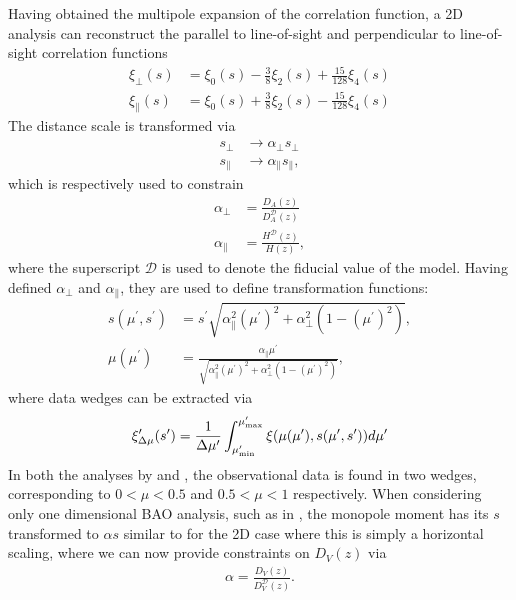 \documentclass[titlesmallcaps, examinerscopy, copyrightpage]{uqthesis}
\begin{document}
Having obtained the multipole expansion of the correlation function, a 2D analysis can reconstruct the parallel to line-of-sight and perpendicular to line-of-sight correlation functions \citep{KazinSanchezBlanton2012, SanchezKazinBeutler2013}
\begin{align}
\xi_\perp(s) &= \xi_0(s) - \frac{3}{8} \xi_2(s) + \frac{15}{128} \xi_4(s) \\
\xi_\parallel(s) &= \xi_0(s) + \frac{3}{8} \xi_2(s) - \frac{15}{128} \xi_4(s)
\end{align}
The distance scale is transformed via
\begin{align}
s_\perp &\rightarrow \alpha_\perp s_\perp \\
s_\parallel &\rightarrow \alpha_\parallel s_\parallel,
\end{align}
which is respectively used to constrain
\begin{align}
\alpha_\perp &= \frac{D_A(z)}{D_A^{\mathcal{D}}(z)} \\
\alpha_\parallel &= \frac{H^{\mathcal{D}}(z)}{H(z)},
\end{align}
where the superscript $\mathcal{D}$ is used to denote the fiducial value of the model. Having defined $\alpha_\perp$ and $\alpha_\parallel$, they are used to define transformation functions:
\begin{align}
s(\mu^\prime, s^\prime) &= s^\prime \sqrt{\alpha_\parallel^2(\mu^\prime)^2 + \alpha_\perp^2 (1 - (\mu^\prime)^2)}, \\
\mu(\mu^\prime) &= \frac{\alpha_\parallel \mu^\prime}{\sqrt{\alpha_\parallel^2(\mu^\prime)^2 + \alpha_\perp^2 (1 - (\mu^\prime)^2)}},
\end{align}
where data wedges can be extracted via
\begin{align}
\xi^\prime_{\Delta \mu}(s^\prime) = \frac{1}{\Delta \mu^\prime} \int_{\mu^\prime_{\rm{min}}}^{\mu^\prime_{\rm{max}}} \xi(\mu(\mu^\prime), s(\mu^\prime, s^\prime)) d\mu^\prime
\end{align}
In both the analyses by \citet{KazinSanchezBlanton2012} and \citet{SanchezKazinBeutler2013}, the observational data is found in two wedges, corresponding to $0 < \mu < 0.5$ and $0.5 < \mu < 1$ respectively. When considering only one dimensional BAO analysis, such as in \citet{BlakeDavis2011}, the monopole moment has its $s$ transformed to $\alpha s$ similar to for the 2D case where this is simply a horizontal scaling, where we can now provide constraints on $D_V(z)$ via
\begin{align}
\alpha = \frac{D_V(z)}{D_V^{\mathcal{D}}(z)}.
\end{align}
\end{document}
